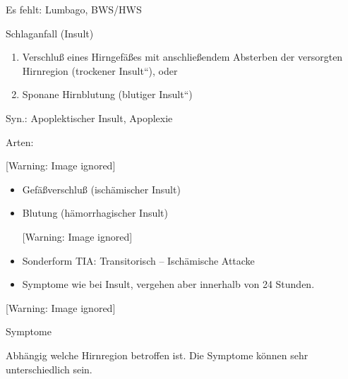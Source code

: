 \documentclass{article}
\begin{document}
Es fehlt: Lumbago, BWS/HWS

Schlaganfall (Insult)

\begin{enumerate}
\item Verschlu{\ss} eines Hirngef\"a{\ss}es mit anschlie{\ss}endem
Absterben der versorgten Hirnregion ({\quotedblbase}trockener
Insult{\textquotedblleft}), oder

\item Sponane Hirnblutung ({\quotedblbase}blutiger
Insult{\textquotedblleft})

\end{enumerate}
Syn.: Apoplektischer Insult, Apoplexie

Arten:

\begin{center}
 [Warning: Image ignored] %

\end{center}
\begin{itemize}
\item Gef\"a{\ss}verschlu{\ss} (isch\"amischer Insult)

\item Blutung (h\"amorrhagischer Insult)

\begin{center}
 [Warning: Image ignored] %

\end{center}
\item Sonderform TIA: Transitorisch -- Isch\"amische Attacke

\end{itemize}
\begin{itemize}
\item Symptome wie bei Insult, vergehen aber innerhalb von 24 Stunden.

\end{itemize}
  [Warning: Image ignored] %
 

Symptome

Abh\"angig welche Hirnregion betroffen ist. Die Symptome k\"onnen sehr
unterschiedlich sein. 
\end{document}
